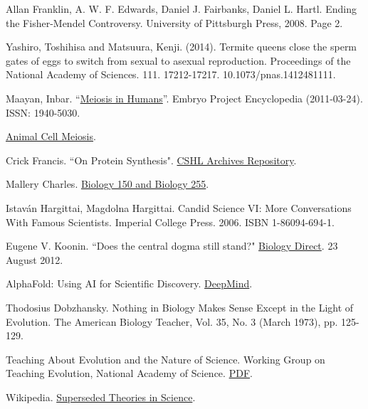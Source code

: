 \begin{thebibliography}{00}
     Allan Franklin, A. W. F. Edwards, Daniel J. Fairbanks, Daniel L. Hartl. Ending the Fisher-Mendel Controversy. University of Pittsburgh Press, 2008. Page 2.

     Yashiro, Toshihisa and Matsuura, Kenji. (2014). Termite queens close the sperm gates of eggs to switch from sexual to asexual reproduction. Proceedings of the National Academy of Sciences. 111. 17212-17217. 10.1073/pnas.1412481111. 

     Maayan, Inbar. ``\href{http://embryo.asu.edu/handle/10776/2084}{Meiosis in Humans}''. Embryo Project Encyclopedia (2011-03-24). ISSN: 1940-5030. 

     \href{https://www.cellsalive.com/meiosis_js.htm}{Animal Cell Meiosis}.

     Crick Francis. ``On Protein Synthesis". \href{https://libgallery.cshl.edu}{CSHL Archives Repository}.

     Mallery Charles. \href{http://henge.bio.miami.edu/mallery/150/}{Biology 150 and Biology 255}.
        
     Istav{\'a}n Hargittai, Magdolna Hargittai. Candid Science VI: More Conversations With Famous Scientists. Imperial College Press. 2006. ISBN 1-86094-694-1.

     Eugene V. Koonin. ``Does the central dogma still stand?" \href{https://biologydirect.biomedcentral.com/articles/10.1186/1745-6150-7-27}{Biology Direct}. 23 August 2012. 
        
     AlphaFold: Using AI for Scientific Discovery. \href{https://deepmind.com/blog/article/AlphaFold-Using-AI-for-scientific-discovery}{DeepMind}.

     Thodosius Dobzhansky. Nothing in Biology Makes Sense Except in the Light of Evolution. The American Biology Teacher, Vol. 35, No. 3 (March 1973), pp. 125-129.
        
     Teaching About Evolution and the Nature of Science. Working Group on Teaching Evolution, National Academy of Science. \href{http://nap.edu/5787}{PDF}.

     Wikipedia. \href{https://en.wikipedia.org/wiki/Superseded_theories_in_science}{Superseded Theories in Science}.
\end{thebibliography}

